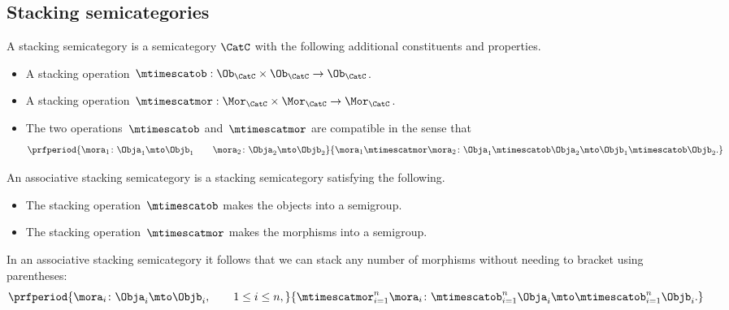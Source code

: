 \subsection{Stacking semicategories}

\begin{ctdefinition}
    \label{def:simple-stacking-semi-cat}
    A stacking semicategory is a semicategory $\CatC$ with the following additional constituents and properties.

    \constit
    \begin{itemize}
        \item A stacking operation~$\mtimescatob : \Ob_\CatC \times \Ob_\CatC \to \Ob_\CatC$.
        \item A stacking operation~$\mtimescatmor : \Mor_\CatC \times \Mor_\CatC \to \Mor_\CatC$.
    \end{itemize}

    \condit
    \begin{itemize}
        \item The two operations~$\mtimescatob$ and~$\mtimescatmor$ are compatible in the sense that
              \begin{equation}
                  \prfperiod{
                      \mora_1 \colon \Obja_1 \mto \Objb_1
                      \qquad
                      \mora_2 \colon \Obja_2 \mto \Objb_2
                  }{
                       \mora_1 \mtimescatmor \mora_2 \colon  \Obja_1 \mtimescatob  \Obja_2 \mto \Objb_1 \mtimescatob \Objb_2.
                  }
              \end{equation}
    \end{itemize}
\end{ctdefinition}

\begin{ctdefinition}
    \label{def:stacking-semi-cat}
    An associative stacking semicategory is a stacking semicategory satisfying the following.
    
    \condit
    \begin{itemize}
        \item The stacking operation~$\mtimescatob$ makes the objects into a semigroup.
        \item The stacking operation~$\mtimescatmor$ makes the morphisms into a semigroup.
    \end{itemize}
\end{ctdefinition}

\begin{remark}
In an associative stacking semicategory it follows that we can stack any number of morphisms without needing to bracket using parentheses:
              \begin{equation}
                  \prfperiod{
                      \mora_i \colon \Obja_i \mto \Objb_i, \qquad 1 \leq i \leq n,
                  }{
                       \mtimescatmor_{i=1}^n \mora_i \colon  \mtimescatob_{i=1}^n \Obja_i \mto \mtimescatob_{i=1}^n \Objb_i.
                  }
              \end{equation}
\end{remark}

